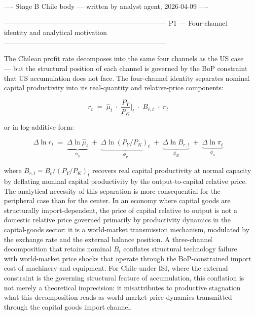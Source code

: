 \documentclass[11pt,a4paper]{article}
\begin{document}
{ ---- Stage B Chile body --- written by analyst agent, 2026-04-09 ----

 -----------------------------------------------------------------------
 P1 --- Four-channel identity and analytical motivation
 -----------------------------------------------------------------------

The Chilean profit rate decomposes into the same four channels as the US
case --- but the structural position of each channel is governed by the
BoP constraint that US accumulation does not face. The four-channel
identity separates nominal capital productivity into its real-quantity
and relative-price components:

\begin{equation}
    r_t \;=\; \hat{\mu}_t \;\cdot\; \frac{P_Y}{P_K}\bigg|_t
              \;\cdot\; B_{r,t} \;\cdot\; \pi_t
    \label{eq:cl:4ch_identity}
\end{equation}

or in log-additive form:

\begin{equation}
    \Delta\ln r_t \;=\; \underbrace{\Delta\ln\hat{\mu}_t}_{\phi_\mu}
    \;+\; \underbrace{\Delta\ln(P_Y/P_K)_t}_{\phi_{p}}
    \;+\; \underbrace{\Delta\ln B_{r,t}}_{\phi_{B}}
    \;+\; \underbrace{\Delta\ln\pi_t}_{\phi_\pi}
    \label{eq:cl:4ch_log}
\end{equation}

where $B_{r,t} = B_t / (P_Y/P_K)_t$ recovers real capital productivity at
normal capacity by deflating nominal capital productivity by the
output-to-capital relative price. The analytical necessity of this
separation is more consequential for the peripheral case than for the
center. In an economy where capital goods are structurally import-dependent,
the price of capital relative to output is not a domestic relative price
governed primarily by productivity dynamics in the capital-goods sector: it
is a world-market transmission mechanism, modulated by the exchange rate and
the external balance position. A three-channel decomposition that retains
nominal $B_t$ conflates structural technology failure with world-market
price shocks that operate through the BoP-constrained import cost of
machinery and equipment. For Chile under ISI, where the external constraint
is the governing structural feature of accumulation, this conflation is not
merely a theoretical imprecision: it misattributes to productive stagnation
what this decomposition reads as world-market price dynamics transmitted
through the capital goods import channel.

}
\end{document}
